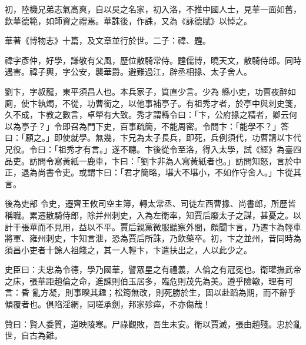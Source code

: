 \begin{pinyinscope}
 初，陸機兄弟志氣高爽，自以吳之名家，初入洛，不推中國人士，見華一面如舊，欽華德範，如師資之禮焉。華誅後，作誄，又為《詠德賦》以悼之。



 華著《博物志》十篇，及文章並行於世。二子：禕、韙。



 禕字彥仲，好學，謙敬有父風，歷位散騎常侍。韙儒博，曉天文，散騎侍郎。同時遇害。禕子輿，字公安，襲華爵。避難過江，辟丞相掾、太子舍人。



 劉卞，字叔龍，東平須昌人也。本兵家子，質直少言。少為
 縣小吏，功曹夜醉如廁，使卞執燭，不從，功曹銜之，以他事補亭子。有祖秀才者，於亭中與刺史箋，久不成，卞教之數言，卓犖有大致。秀才謂縣令曰：「卞，公府掾之精者，卿云何以為亭子？」令即召為門下史，百事疏簡，不能周密。令問卞：「能學不？」答曰：「願之。」即使就學。無幾，卞兄為太子長兵，即死，兵例須代，功曹請以卞代兄役。令曰：「祖秀才有言。」遂不聽。卞後從令至洛，得入太學，試《經》為臺四品吏。訪問令寫黃紙一鹿車，卞曰：「劉卞非為人寫黃紙者也。」訪問知怒，言於中正，退為尚書令吏。或謂卞曰：「君才簡略，堪大不堪小，不如作守舍人。」卞從其言。



 後為吏部
 令史，遷齊王攸司空主簿，轉太常丞、司徒左西曹掾、尚書郎，所歷皆稱職。累遷散騎侍郎，除并州刺史，入為左衛率，知賈后廢太子之謀，甚憂之。以計干張華而不見用，益以不平。賈后親黨微服聽察外間，頗聞卞言，乃遷卞為輕車將軍、雍州刺史，卞知言泄，恐為賈后所誅，乃飲藥卒。初，卞之並州，昔同時為須昌小吏者十餘人祖餞之，其一人輕卞，卞遣扶出之，人以此少之。



 史臣曰：夫忠為令德，學乃國華，譬眾星之有禮義，人倫之有冠冕也。衛瓘撫武帝之床，張華距趙倫之命，進諫則伯玉居多，臨危則茂先為美。遵乎險轍，理有可言：昏
 亂方凝，則事睽其趣；松筠無改，則死勝於生，固以赴蹈為期，而不辭乎傾覆者也。俱陷淫網，同嗟承劍，邦家殄瘁，不亦傷哉！



 贊曰：賢人委質，道映陵寒。尸祿觀敗，吾生未安。衛以賈滅，張由趙殘。忠於亂世，自古為難。



\end{pinyinscope}